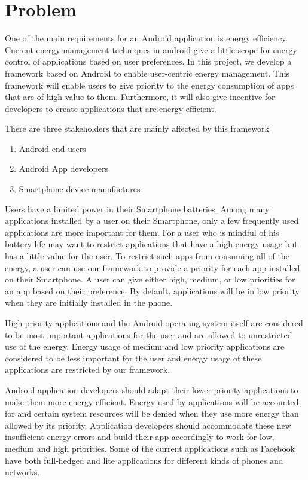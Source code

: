 \section{Problem}
\label{motivation}


One of the main requirements for an Android application is energy efficiency. Current energy management techniques in android give a little scope for energy control of applications based on user preferences. In this project, we develop a framework based on Android to enable user-centric energy management. This framework will enable users to give priority to the energy consumption of apps that are of high value to them. Furthermore, it will also give incentive for developers to create applications that are energy efficient. 


There are three stakeholders that are mainly affected by this framework

\begin{enumerate}

\item Android end users
\item Android App developers
\item Smartphone device manufactures

\end{enumerate}

Users have a limited power in their Smartphone batteries. Among many applications installed by a user on their Smartphone, only a few frequently used applications are more important for them. For a user who is mindful of his battery life may want to restrict applications that have a high energy usage but has a little value for the user. To restrict such apps from consuming all of the energy, a user can use our framework to provide a priority for each app installed on their Smartphone. A user can give either high, medium, or low priorities for an app based on their preference. By default, applications will be in low priority when they are initially installed in the phone. 

High priority applications and the Android operating system itself are considered to be most important applications for the user and are allowed to unrestricted use of the energy. Energy usage of medium and low priority applications are considered to be less important for the user and energy usage of these applications are restricted by our framework. 

Android application developers should adapt their lower priority applications to make them more energy efficient. Energy used by applications will be accounted for and certain system resources will be denied when they use more energy than allowed by its priority. Application developers should accommodate these new insufficient energy errors and build their app accordingly to work for low, medium and high priorities. Some of the current applications such as Facebook have both full-fledged and lite applications for different kinds of phones and networks.

